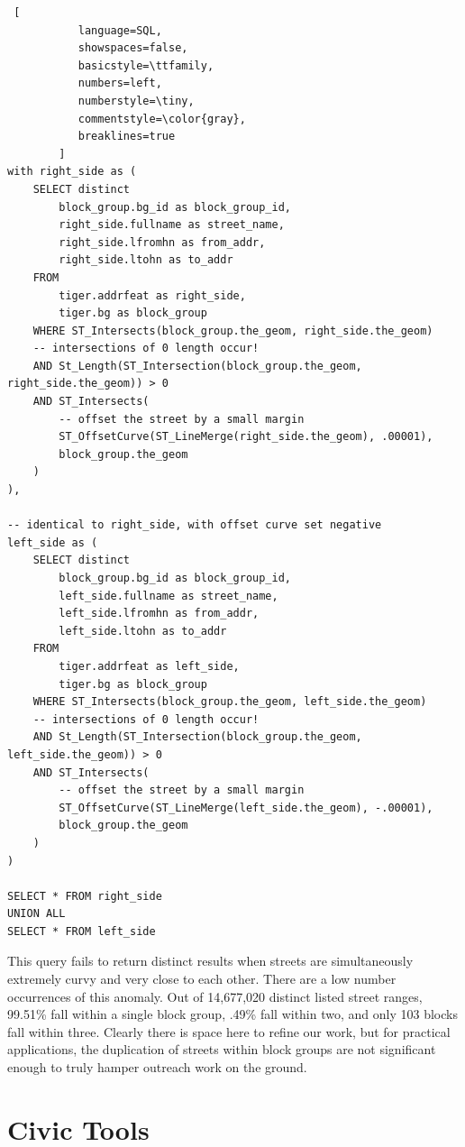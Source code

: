 \documentclass{sig-alternate}
\begin{document}
\begin{lstlisting} [
           language=SQL,
           showspaces=false,
           basicstyle=\ttfamily,
           numbers=left,
           numberstyle=\tiny,
           commentstyle=\color{gray},
           breaklines=true
        ]
with right_side as (
    SELECT distinct
        block_group.bg_id as block_group_id,
        right_side.fullname as street_name,
        right_side.lfromhn as from_addr,
        right_side.ltohn as to_addr
    FROM
        tiger.addrfeat as right_side,
        tiger.bg as block_group
    WHERE ST_Intersects(block_group.the_geom, right_side.the_geom)
    -- intersections of 0 length occur!
    AND St_Length(ST_Intersection(block_group.the_geom, right_side.the_geom)) > 0
    AND ST_Intersects(
        -- offset the street by a small margin
        ST_OffsetCurve(ST_LineMerge(right_side.the_geom), .00001),
        block_group.the_geom
    )
),

-- identical to right_side, with offset curve set negative
left_side as (
    SELECT distinct
        block_group.bg_id as block_group_id,
        left_side.fullname as street_name,
        left_side.lfromhn as from_addr,
        left_side.ltohn as to_addr
    FROM
        tiger.addrfeat as left_side,
        tiger.bg as block_group
    WHERE ST_Intersects(block_group.the_geom, left_side.the_geom)
    -- intersections of 0 length occur!
    AND St_Length(ST_Intersection(block_group.the_geom, left_side.the_geom)) > 0
    AND ST_Intersects(
        -- offset the street by a small margin
        ST_OffsetCurve(ST_LineMerge(left_side.the_geom), -.00001),
        block_group.the_geom
    )
)

SELECT * FROM right_side
UNION ALL
SELECT * FROM left_side
\end{lstlisting}

This query fails to return distinct results when streets are simultaneously extremely curvy and very close to each other. There are a low number occurrences of this anomaly. Out of 14,677,020 distinct listed street ranges, 99.51\% fall within a single block group, .49\% fall within two, and only 103 blocks fall within three. Clearly there is space here to refine our work, but for practical applications, the duplication of streets within block groups are not significant enough to truly hamper outreach work on the ground.

\section{Civic Tools}
\end{document}
